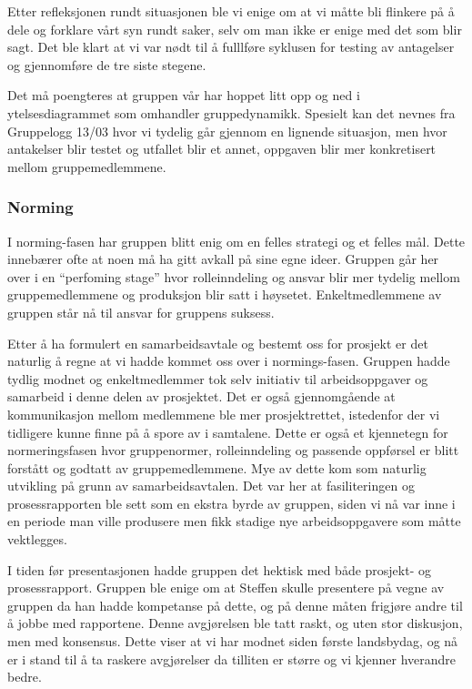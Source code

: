 \documentclass[a4paper,norsk,oneside]{article}
\begin{document}
Etter refleksjonen rundt situasjonen ble vi enige om at vi måtte bli flinkere på å dele og forklare vårt syn rundt saker, selv om man ikke er enige med det som blir sagt. Det ble klart at vi var nødt til å fulllføre syklusen for testing av antagelser og gjennomføre de tre siste stegene. 

Det må poengteres at gruppen vår har hoppet litt opp og ned i ytelsesdiagrammet som omhandler gruppedynamikk. Spesielt kan det nevnes fra Gruppelogg 13/03 hvor vi tydelig går gjennom en lignende situasjon, men hvor antakelser blir testet og utfallet blir et annet, oppgaven blir mer konkretisert mellom gruppemedlemmene. 

\subsubsection{Norming}
I norming-fasen har gruppen blitt enig om en felles strategi og et felles mål. Dette innebærer ofte at noen må ha gitt avkall på sine egne ideer. Gruppen går her over i en “perfoming stage” \cite{johnson2008joining} hvor rolleinndeling og ansvar blir mer tydelig mellom gruppemedlemmene og produksjon blir satt i høysetet. Enkeltmedlemmene av gruppen står nå til ansvar for gruppens suksess.

Etter å ha formulert en samarbeidsavtale og bestemt oss for prosjekt er det naturlig å regne at vi hadde kommet oss over i normings-fasen. Gruppen hadde tydlig modnet og enkeltmedlemmer tok selv initiativ til arbeidsoppgaver og samarbeid i denne delen av prosjektet. Det er også gjennomgående at kommunikasjon mellom medlemmene ble mer prosjektrettet, istedenfor der vi tidligere kunne finne på å spore av i samtalene. Dette er også et kjennetegn for normeringsfasen hvor gruppenormer, rolleinndeling og passende oppførsel er blitt forstått og godtatt av gruppemedlemmene. Mye av dette kom som naturlig utvikling på grunn av samarbeidsavtalen. Det var her at fasiliteringen og prosessrapporten ble sett som en ekstra byrde av gruppen, siden vi nå var inne i en periode man ville produsere men fikk stadige nye arbeidsoppgavere som måtte vektlegges. 

I tiden før presentasjonen hadde gruppen det hektisk med både prosjekt- og prosessrapport. Gruppen ble enige om at Steffen skulle presentere på vegne av gruppen da han hadde kompetanse på dette, og på denne måten frigjøre andre til å jobbe med rapportene. Denne avgjørelsen ble tatt raskt, og uten stor diskusjon, men med konsensus. Dette viser at vi har modnet siden første landsbydag, og nå er i stand til å ta raskere avgjørelser da tilliten er større og vi kjenner hverandre bedre.
\end{document}
